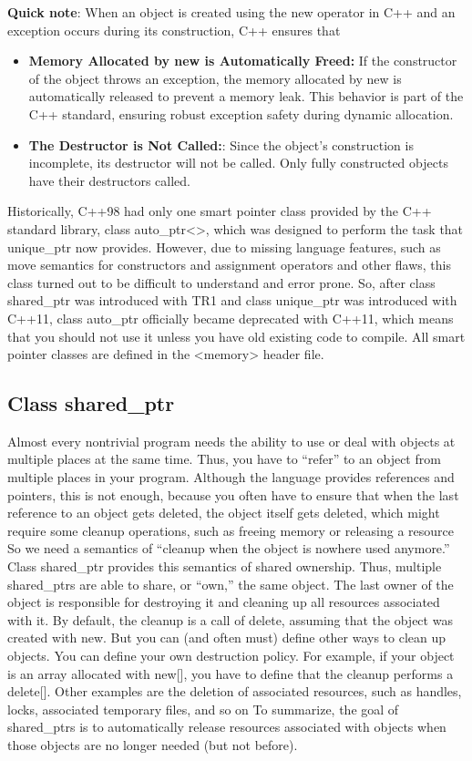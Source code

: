\documentclass{report}
\begin{document}
\textbf{Quick note}: When an object is created using the new operator in C++ and an exception occurs during its construction, C++ ensures that
\begin{itemize}
    \item \textbf{Memory Allocated by new is Automatically Freed:} If the constructor of the object throws an exception, the memory allocated by new is automatically released to prevent a memory leak.
        \bigbreak \noindent 
        This behavior is part of the C++ standard, ensuring robust exception safety during dynamic allocation.
    \item \textbf{The Destructor is Not Called:}: Since the object's construction is incomplete, its destructor will not be called. Only fully constructed objects have their destructors called.
\end{itemize}
\bigbreak \noindent 
Historically, C++98 had only one smart pointer class provided by the C++ standard library, class
auto\_ptr<>, which was designed to perform the task that unique\_ptr now provides. However,
due to missing language features, such as move semantics for constructors and assignment operators
and other flaws, this class turned out to be difficult to understand and error prone. So, after class
shared\_ptr was introduced with TR1 and class unique\_ptr was introduced with C++11, class
auto\_ptr officially became deprecated with C++11, which means that you should not use it unless
you have old existing code to compile.
\bigbreak \noindent 
All smart pointer classes are defined in the <memory> header file.
\bigbreak \noindent 
\subsection{Class shared\_ptr}
\bigbreak \noindent 
Almost every nontrivial program needs the ability to use or deal with objects at multiple places at the
same time. Thus, you have to “refer” to an object from multiple places in your program. Although
the language provides references and pointers, this is not enough, because you often have to ensure
that when the last reference to an object gets deleted, the object itself gets deleted, which might
require some cleanup operations, such as freeing memory or releasing a resource
\bigbreak \noindent 
So we need a semantics of “cleanup when the object is nowhere used anymore.” Class shared\_ptr provides this semantics of shared ownership. Thus, multiple shared\_ptrs are able to share, or “own,” the same object. The last owner of the object is responsible for destroying it and cleaning up all resources associated with it.
\bigbreak \noindent 
By default, the cleanup is a call of delete, assuming that the object was created with new. But you can (and often must) define other ways to clean up objects. You can define your own destruction policy. For example, if your object is an array allocated with new[], you have to define that the cleanup performs a delete[]. Other examples are the deletion of associated resources, such as handles, locks, associated temporary files, and so on
\bigbreak \noindent 
To summarize, the goal of shared\_ptrs is to automatically release resources associated with objects when those objects are no longer needed (but not before).
\bigbreak \noindent 
\end{document}
